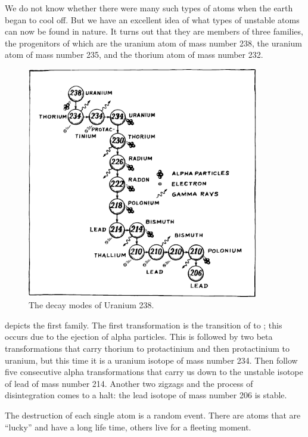 We do not know whether there were many such types of atoms when the earth began to cool off. But we have an excellent idea of what types of unstable atoms can now be found in nature. It turns out that they are members of three families, the progenitors of which are the uranium atom of mass number 238, the uranium atom of mass number 235, and the thorium atom of mass number 232.

\begin{figure}[!ht]
\centering
\includegraphics[width=0.9\textwidth]{figures/fig-05-03.pdf}
\caption{The decay modes of Uranium 238.}
\label{fig-5.3}
\end{figure}


 depicts the first family. The first transfor­mation is the transition of  to ; this occurs due to the ejection of alpha particles. This is followed by two beta transformations that carry thorium to prot­actinium and then protactinium to uranium, but this time it is a uranium isotope of mass number 234. Then follow five consecutive alpha transformations that carry us down to the unstable isotope of lead of mass number 214. Another two zigzags and the process of disintegration comes to a halt: the lead isotope of mass number 206 is stable.

The destruction of each single atom is a random event. There are atoms that are ``lucky'' and have a long life­ time, others live for a fleeting moment.

